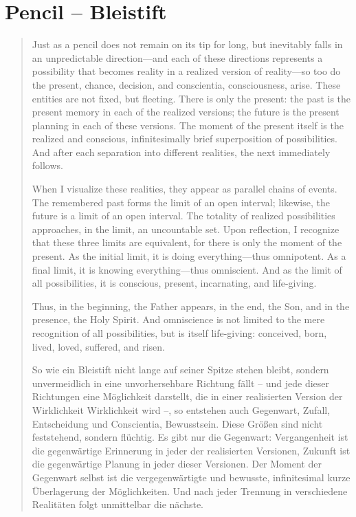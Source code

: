 \documentclass[
  ngerman,
]{article}
\begin{document}
\section{\texorpdfstring{\textbf{Pencil --
Bleistift}}{Pencil -- Bleistift}}\label{pencil-bleistift}

\begin{quote}
Just as a pencil does not remain on its tip for long, but inevitably
falls in an unpredictable direction---and each of these directions
represents a possibility that becomes reality in a realized version of
reality---so too do the present, chance, decision, and conscientia,
consciousness, arise. These entities are not fixed, but fleeting. There
is only the present: the past is the present memory in each of the
realized versions; the future is the present planning in each of these
versions. The moment of the present itself is the realized and
conscious, infinitesimally brief superposition of possibilities. And
after each separation into different realities, the next immediately
follows.

When I visualize these realities, they appear as parallel chains of
events. The remembered past forms the limit of an open interval;
likewise, the future is a limit of an open interval. The totality of
realized possibilities approaches, in the limit, an uncountable set.
Upon reflection, I recognize that these three limits are equivalent, for
there is only the moment of the present. As the initial limit, it is
doing everything---thus omnipotent. As a final limit, it is knowing
everything---thus omniscient. And as the limit of all possibilities, it
is conscious, present, incarnating, and life-giving.

Thus, in the beginning, the Father appears, in the end, the Son, and in
the presence, the Holy Spirit. And omniscience is not limited to the
mere recognition of all possibilities, but is itself life-giving:
conceived, born, lived, loved, suffered, and risen.

So wie ein Bleistift nicht lange auf seiner Spitze stehen bleibt,
sondern unvermeidlich in eine unvorhersehbare Richtung fällt -- und jede
dieser Richtungen eine Möglichkeit darstellt, die in einer realisierten
Version der Wirklichkeit Wirklichkeit wird --, so entstehen auch
Gegenwart, Zufall, Entscheidung und Conscientia, Bewusstsein. Diese
Größen sind nicht feststehend, sondern flüchtig. Es gibt nur die
Gegenwart: Vergangenheit ist die gegenwärtige Erinnerung in jeder der
realisierten Versionen, Zukunft ist die gegenwärtige Planung in jeder
dieser Versionen. Der Moment der Gegenwart selbst ist die
vergegenwärtigte und bewusste, infinitesimal kurze Überlagerung der
Möglichkeiten. Und nach jeder Trennung in verschiedene Realitäten folgt
unmittelbar die nächste.


\end{quote}
\end{document}
